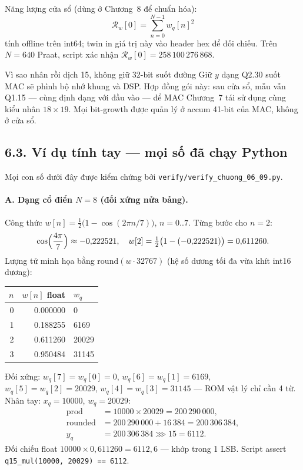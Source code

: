 Năng lượng cửa sổ (dùng ở Chương~8 để chuẩn hóa):
\[
\mathcal{R}_w[0] = \sum_{n=0}^{N-1} w_q[n]^2
\]
tính offline trên int64; twin in giá trị này vào header hex để đối chiếu. Trên $N=640$ Praat, script xác nhận $\mathcal{R}_w[0] = 258\,100\,276\,868$.

\begin{firstprin}{Vì sao nhân rồi dịch 15, không giữ 32-bit suốt đường}
Giữ $y$ dạng Q2.30 suốt MAC sẽ phình bộ nhớ khung và DSP. Hợp đồng gói này: sau cửa sổ, mẫu vẫn Q1.15 --- cùng định dạng với đầu vào --- để MAC Chương~7 tái sử dụng cùng kiểu nhân $18\times 19$. Mọi bit-growth được quản lý ở accum 41-bit của MAC, không ở cửa sổ.
\end{firstprin}

\subsection*{6.3. Ví dụ tính tay --- mọi số đã chạy Python}

Mọi con số dưới đây được kiểm chứng bởi \texttt{verify/verify\_chuong\_06\_09.py}.

\paragraph{A. Dạng cổ điển $N=8$ (đối xứng nửa bảng).}
Công thức $w[n] = \tfrac12\bigl(1 - \cos(2\pi n/7)\bigr)$, $n = 0..7$. Từng bước cho $n=2$:
\[
\cos\Bigl(\frac{4\pi}{7}\Bigr) \approx -0{,}222521,\quad
w[2] = \tfrac12\bigl(1 - (-0{,}222521)\bigr) = 0{,}611260.
\]
Lượng tử minh họa bằng $\mathrm{round}(w\cdot 32767)$ (hệ số dương tối đa vừa khít int16 dương):
\begin{center}\small
\begin{tabular}{@{}rrl@{}}\toprule
$n$ & $w[n]$ float & $w_q$ \\
\midrule
0 & 0.000000 & 0 \\
1 & 0.188255 & 6169 \\
2 & 0.611260 & 20029 \\
3 & 0.950484 & 31145 \\
\bottomrule
\end{tabular}
\end{center}
Đối xứng: $w_q[7] = w_q[0]=0$, $w_q[6] = w_q[1]=6169$, $w_q[5]=w_q[2]=20029$, $w_q[4]=w_q[3]=31145$ --- ROM vật lý chỉ cần 4 từ. Nhân tay: $x_q = 10000$, $w_q = 20029$:
\begin{align*}
\mathrm{prod} &= 10000 \times 20029 = 200\,290\,000,\\
\mathrm{rounded} &= 200\,290\,000 + 16\,384 = 200\,306\,384,\\
y_q &= 200\,306\,384 \ggg 15 = 6112.
\end{align*}
Đối chiếu float $10000\times 0{,}611260 = 6112{,}6$ --- khớp trong 1 LSB. Script assert \texttt{q15\_mul(10000, 20029) == 6112}.

